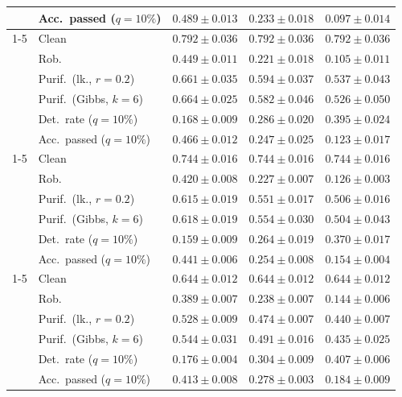 \begin{table}[htbp]
\begin{tabular}{@{}llrrr@{}}
     & Acc.\ passed ($q{=}10\%$) & $0.489 \pm 0.013$ & $0.233 \pm 0.018$ & $0.097 \pm 0.014$ \\
    \cmidrule(lr){1-5}
    \multirow{6}{*}{$\alpha{=}0.2$} & Clean & $0.792 \pm 0.036$ & $0.792 \pm 0.036$ & $0.792 \pm 0.036$ \\
     & Rob. & $0.449 \pm 0.011$ & $0.221 \pm 0.018$ & $0.105 \pm 0.011$ \\
     & Purif.\ (lk., $r{=}0.2$) & $0.661 \pm 0.035$ & $0.594 \pm 0.037$ & $0.537 \pm 0.043$ \\
     & Purif.\ (Gibbs, $k{=}6$) & $0.664 \pm 0.025$ & $0.582 \pm 0.046$ & $0.526 \pm 0.050$ \\
     & Det.\ rate ($q{=}10\%$) & $0.168 \pm 0.009$ & $0.286 \pm 0.020$ & $0.395 \pm 0.024$ \\
     & Acc.\ passed ($q{=}10\%$) & $0.466 \pm 0.012$ & $0.247 \pm 0.025$ & $0.123 \pm 0.017$ \\
    \cmidrule(lr){1-5}
    \multirow{6}{*}{$\alpha{=}0.5$} & Clean & $0.744 \pm 0.016$ & $0.744 \pm 0.016$ & $0.744 \pm 0.016$ \\
     & Rob. & $0.420 \pm 0.008$ & $0.227 \pm 0.007$ & $0.126 \pm 0.003$ \\
     & Purif.\ (lk., $r{=}0.2$) & $0.615 \pm 0.019$ & $0.551 \pm 0.017$ & $0.506 \pm 0.016$ \\
     & Purif.\ (Gibbs, $k{=}6$) & $0.618 \pm 0.019$ & $0.554 \pm 0.030$ & $0.504 \pm 0.043$ \\
     & Det.\ rate ($q{=}10\%$) & $0.159 \pm 0.009$ & $0.264 \pm 0.019$ & $0.370 \pm 0.017$ \\
     & Acc.\ passed ($q{=}10\%$) & $0.441 \pm 0.006$ & $0.254 \pm 0.008$ & $0.154 \pm 0.004$ \\
    \cmidrule(lr){1-5}
    \multirow{6}{*}{$\alpha{=}1$} & Clean & $0.644 \pm 0.012$ & $0.644 \pm 0.012$ & $0.644 \pm 0.012$ \\
     & Rob. & $0.389 \pm 0.007$ & $0.238 \pm 0.007$ & $0.144 \pm 0.006$ \\
     & Purif.\ (lk., $r{=}0.2$) & $0.528 \pm 0.009$ & $0.474 \pm 0.007$ & $0.440 \pm 0.007$ \\
     & Purif.\ (Gibbs, $k{=}6$) & $0.544 \pm 0.031$ & $0.491 \pm 0.016$ & $0.435 \pm 0.025$ \\
     & Det.\ rate ($q{=}10\%$) & $0.176 \pm 0.004$ & $0.304 \pm 0.009$ & $0.407 \pm 0.006$ \\
     & Acc.\ passed ($q{=}10\%$) & $0.413 \pm 0.008$ & $0.278 \pm 0.003$ & $0.184 \pm 0.009$ \\

\end{tabular}
\end{table}
